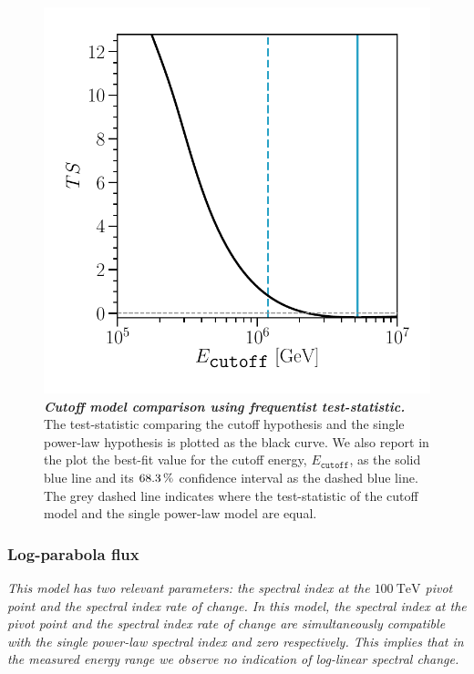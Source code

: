 \begin{figure}
	\centering
	\includegraphics[width=\linewidth]{figures/hese_paper/cutoff_freq}
	\internallinenumbers
	\caption{\textbf{\textit{Cutoff model comparison using frequentist test-statistic.}}
		The test-statistic comparing the cutoff hypothesis and the single power-law hypothesis is plotted as the black curve.
		We also report in the plot the best-fit value for the cutoff energy, $E_\texttt{cutoff}$, as the solid blue line and its $\SI{68.3}\percent$ confidence interval as the dashed blue line.
		The grey dashed line indicates where the test-statistic of the cutoff model and the single power-law model are equal.}\label{fig:cutoff_freq}
\end{figure}

\subsubsection{Log-parabola flux\label{sec:log_parabola}}

\noindent
\textit{%
	This model has two relevant parameters: the spectral index at the $\SI{100}\TeV$ pivot point and the spectral index rate of change.
	In this model, the spectral index at the pivot point and the spectral index rate of change are simultaneously compatible with the single power-law spectral index and zero respectively.
	This implies that in the measured energy range we observe no indication of log-linear spectral change.
}
\newline

